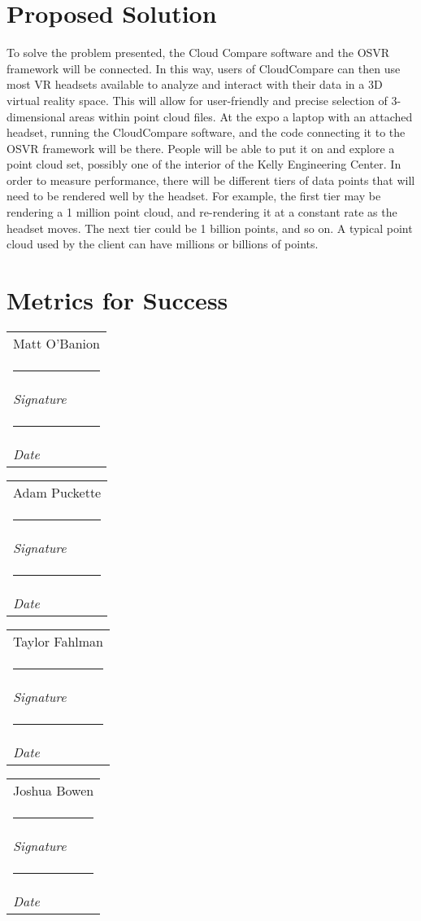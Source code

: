 \documentclass{article}
\makeatletter
\newcommand{\namesigdate}[2][5cm]{%
  \begin{tabular}{@{}p{#1}@{}}
    #2 \\[2\normalbaselineskip] \hrule \\[0pt]
    {\small \textit{Signature}} \\[2\normalbaselineskip] \hrule \\[0pt]
    {\small \textit{Date}}
  \end{tabular}
}
\makeatother
\begin{document}
\section*{Proposed Solution}

To solve the problem presented, the Cloud Compare software and the OSVR framework will be connected. In this way, users of CloudCompare can then use most VR headsets available to analyze and interact with their data in a 3D virtual reality space. This will allow for user-friendly and precise selection of 3-dimensional areas within point cloud files. At the expo a laptop with an attached headset, running the CloudCompare software, and the code connecting it to the OSVR framework will be there. People will be able to put it on and explore a point cloud set, possibly one of the interior of the Kelly Engineering Center. In order to measure performance, there will be different tiers of data points that will need to be rendered well by the headset. For example, the first tier may be rendering a 1 million point cloud, and re-rendering it at a constant rate as the headset moves. The next tier could be 1 billion points, and so on. A typical point cloud used by the client can have millions or billions of points. 

\section*{Metrics for Success}

\vspace{2pc}

\noindent \namesigdate{Matt O'Banion} \hfill \namesigdate[3cm]{Adam Puckette}

\vspace{2pc}

\noindent \namesigdate{Taylor Fahlman} \hfill \namesigdate[3cm]{Joshua Bowen}
\end{document}
